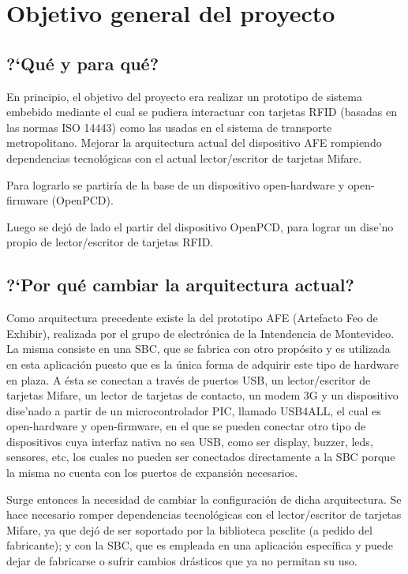 \chapter{Objetivo general del proyecto}

\section{?`Qu\'e y para qu\'e?}

En principio, el objetivo del proyecto era realizar un prototipo de sistema embebido mediante el cual se pudiera interactuar con tarjetas RFID (basadas en las normas ISO 14443) como las usadas en el sistema de transporte metropolitano.
Mejorar la arquitectura actual del dispositivo AFE rompiendo dependencias tecnol\'ogicas con el actual lector/escritor de tarjetas Mifare.

Para lograrlo se partir\'ia de la base de un dispositivo open-hardware y open-firmware (OpenPCD).

Luego se dej\'o de lado el partir del dispositivo OpenPCD, para lograr un dise'no propio de lector/escritor de tarjetas RFID.

\section{?`Por qu\'e cambiar la arquitectura actual?}

Como arquitectura precedente existe la del prototipo AFE (Artefacto Feo de Exhibir), realizada por el grupo de electr\'onica de la Intendencia de Montevideo. La misma consiste en una SBC, que se fabrica con otro prop\'osito y es utilizada en esta aplicaci\'on puesto que es la \'unica forma de adquirir este tipo de hardware en plaza. A \'esta se conectan a trav\'es de puertos USB, un lector/escritor de tarjetas Mifare, un lector de tarjetas de contacto, un modem 3G y un dispositivo dise'nado a partir de un microcontrolador PIC, llamado USB4ALL, el cual es open-hardware y open-firmware, en el que se pueden conectar otro tipo de dispositivos cuya interfaz nativa no sea USB, como ser display, buzzer, leds, sensores, etc, los cuales no pueden ser conectados directamente a la SBC porque la misma no cuenta con los puertos de expansi\'on necesarios.

Surge entonces la necesidad de cambiar la configuraci\'on de dicha arquitectura. Se hace necesario romper dependencias tecnol\'ogicas con el lector/escritor de tarjetas Mifare, ya que dej\'o de ser soportado por la biblioteca pcsclite (a pedido del fabricante); y con la SBC, que es empleada en una aplicaci\'on espec\'ifica y puede dejar de fabricarse o sufrir cambios dr\'asticos que ya no permitan su uso.



